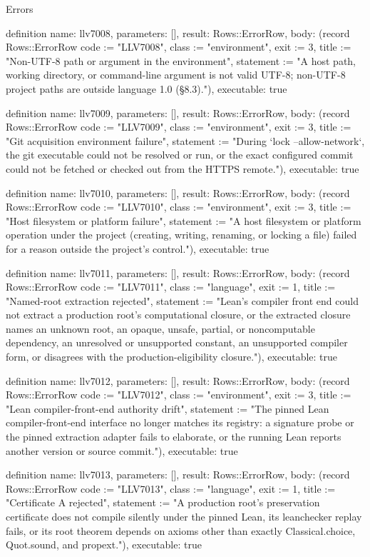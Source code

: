 \begin{lexlean}{Errors}
\begin{semanticmodule}
definition{
  name: llv7008,
  parameters: [],
  result: Rows::ErrorRow,
  body: (record Rows::ErrorRow {code := "LLV7008", class := "environment", exit := 3, title := "Non-UTF-8 path or argument in the environment", statement := "A host path, working directory, or command-line argument is not valid UTF-8; non-UTF-8 project paths are outside language 1.0 (§8.3)."}),
  executable: true
}

definition{
  name: llv7009,
  parameters: [],
  result: Rows::ErrorRow,
  body: (record Rows::ErrorRow {code := "LLV7009", class := "environment", exit := 3, title := "Git acquisition environment failure", statement := "During `lock --allow-network`, the git executable could not be resolved or run, or the exact configured commit could not be fetched or checked out from the HTTPS remote."}),
  executable: true
}

definition{
  name: llv7010,
  parameters: [],
  result: Rows::ErrorRow,
  body: (record Rows::ErrorRow {code := "LLV7010", class := "environment", exit := 3, title := "Host filesystem or platform failure", statement := "A host filesystem or platform operation under the project (creating, writing, renaming, or locking a file) failed for a reason outside the project's control."}),
  executable: true
}

definition{
  name: llv7011,
  parameters: [],
  result: Rows::ErrorRow,
  body: (record Rows::ErrorRow {code := "LLV7011", class := "language", exit := 1, title := "Named-root extraction rejected", statement := "Lean's compiler front end could not extract a production root's computational closure, or the extracted closure names an unknown root, an opaque, unsafe, partial, or noncomputable dependency, an unresolved or unsupported constant, an unsupported compiler form, or disagrees with the production-eligibility closure."}),
  executable: true
}

definition{
  name: llv7012,
  parameters: [],
  result: Rows::ErrorRow,
  body: (record Rows::ErrorRow {code := "LLV7012", class := "environment", exit := 3, title := "Lean compiler-front-end authority drift", statement := "The pinned Lean compiler-front-end interface no longer matches its registry: a signature probe or the pinned extraction adapter fails to elaborate, or the running Lean reports another version or source commit."}),
  executable: true
}

definition{
  name: llv7013,
  parameters: [],
  result: Rows::ErrorRow,
  body: (record Rows::ErrorRow {code := "LLV7013", class := "language", exit := 1, title := "Certificate A rejected", statement := "A production root's preservation certificate does not compile silently under the pinned Lean, its leanchecker replay fails, or its root theorem depends on axioms other than exactly Classical.choice, Quot.sound, and propext."}),
  executable: true
}


\end{semanticmodule}
\end{lexlean}
